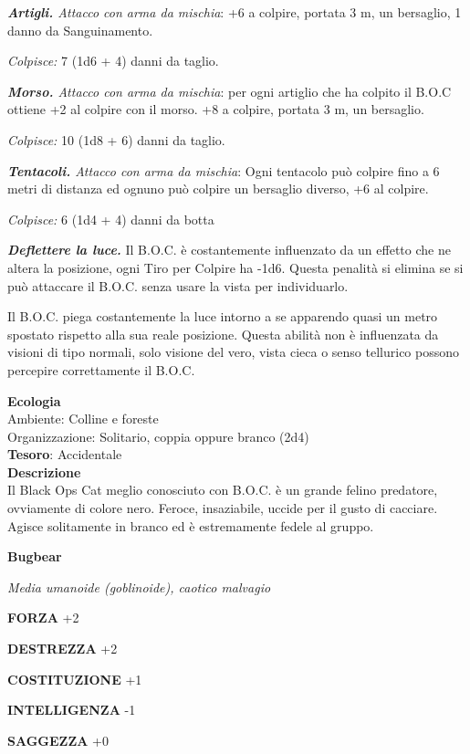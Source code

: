 \begin{multicols}{2}
	\textit{\textbf{Artigli.} Attacco con arma da mischia}: +6 a colpire, portata 3 m, un bersaglio, 1 danno da Sanguinamento.

	\textit{Colpisce:} 7 (1d6 + 4) danni da taglio.

	\textit{\textbf{Morso.} Attacco con arma da mischia}: per ogni artiglio che ha colpito il B.O.C ottiene +2 al colpire con il morso. +8 a colpire, portata 3 m, un bersaglio.

	\textit{Colpisce:} 10 (1d8 + 6) danni da taglio.

	\textit{\textbf{Tentacoli.} Attacco con arma da mischia}: Ogni tentacolo può colpire fino a 6 metri di distanza ed ognuno può colpire un bersaglio diverso, +6 al colpire.

	\textit{Colpisce:} 6 (1d4 + 4) danni da botta

	\textit{\textbf{Deflettere la luce.}} Il B.O.C. è costantemente influenzato da un effetto che ne altera la posizione, ogni Tiro per Colpire ha -1d6. Questa penalità si elimina se si può attaccare il B.O.C. senza usare la vista per individuarlo.

	Il B.O.C. piega costantemente la luce intorno a se apparendo quasi un metro spostato rispetto alla sua reale posizione. Questa abilità non è influenzata da visioni di tipo normali, solo visione del vero, vista cieca o senso tellurico possono percepire correttamente il B.O.C.

	\textbf{Ecologia}\\
	Ambiente: Colline e foreste\\
	Organizzazione: Solitario, coppia oppure branco (2d4)\\
	\textbf{Tesoro}: Accidentale\\
	\textbf{Descrizione}\\
	Il Black Ops Cat meglio conosciuto con B.O.C. è un grande felino predatore, ovviamente di colore nero. Feroce, insaziabile, uccide per il gusto di cacciare. Agisce solitamente in branco ed è estremamente fedele al gruppo.

	\medskip{}\textbf{Bugbear}

	\textit{Media umanoide (goblinoide), caotico malvagio}

	\textbf{FORZA} +2

	\textbf{DESTREZZA} +2

	\textbf{COSTITUZIONE} +1

	\textbf{INTELLIGENZA} -1

	\textbf{SAGGEZZA} +0


\end{multicols}
